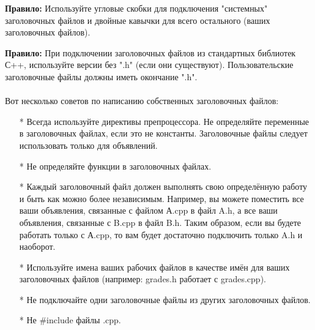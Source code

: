 \documentclass[a4paper,16pt]{report} %
\begin{document}
\begin{sloppypar}
	\textbf{Правило:} Используйте угловые скобки для подключения "системных" заголовочных файлов и двойные кавычки для всего остального (ваших заголовочных файлов).
\end{sloppypar}
\begin{sloppypar}
	\textbf{Правило:} При подключении заголовочных файлов из стандартных библиотек С++, используйте версии без ".h" (если они существуют). Пользовательские заголовочные файлы должны иметь окончание ".h".
\\ \\
Вот несколько советов по написанию собственных заголовочных файлов:
\begin{itemize}
	\item[*]Всегда используйте директивы препроцессора.
	Не определяйте переменные в заголовочных файлах, если это не константы. Заголовочные файлы следует использовать только для объявлений.
	\item[*]Не определяйте функции в заголовочных файлах.
	\item[*]Каждый заголовочный файл должен выполнять свою определённую работу и быть как можно более независимым. Например, вы можете поместить все ваши объявления, связанные с файлом А.cpp в файл A.h, а все ваши объявления, связанные с B.cpp в файл B.h. Таким образом, если вы будете работать только с А.cpp, то вам будет достаточно подключить только A.h и наоборот.
	\item[*]Используйте имена ваших рабочих файлов в качестве имён для ваших заголовочных файлов (например: grades.h работает с grades.cpp).
	\item[*]Не подключайте одни заголовочные файлы из других заголовочных файлов.
	\item[*]Не \#include  файлы .cpp.
\end{itemize}
\end{sloppypar}
\end{document}
